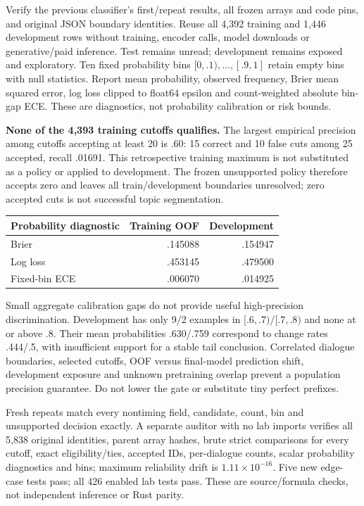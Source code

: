 \documentclass[11pt]{article}
\begin{document}
Verify the previous classifier's first/repeat results, all frozen arrays and
code pins, and original JSON boundary identities. Reuse all 4,392 training and
1,446 development rows without training, encoder calls, model downloads or
generative/paid inference. Test remains unread; development remains exposed and
exploratory. Ten fixed probability bins $[0,.1),\ldots,[.9,1]$ retain empty bins
with null statistics. Report mean probability, observed frequency, Brier mean
squared error, log loss clipped to float64 epsilon and count-weighted absolute
bin-gap ECE. These are diagnostics, not probability calibration or risk bounds.

\textbf{None of the 4,393 training cutoffs qualifies.} The largest empirical
precision among cutoffs accepting at least 20 is .60: 15 correct and 10 false
cuts among 25 accepted, recall .01691. This retrospective training maximum is
not substituted as a policy or applied to development. The frozen unsupported
policy therefore accepts zero and leaves all train/development boundaries
unresolved; zero accepted cuts is not successful topic segmentation.

\begin{center}\small
\begin{tabular}{lrr}
\toprule
Probability diagnostic & Training OOF & Development\\
\midrule
Brier & .145088 & .154947\\
Log loss & .453145 & .479500\\
Fixed-bin ECE & .006070 & .014925\\
\bottomrule
\end{tabular}\end{center}
Small aggregate calibration gaps do not provide useful high-precision
discrimination. Development has only 9/2 examples in $[.6,.7)/[.7,.8)$ and none
at or above .8. Their mean probabilities .630/.759 correspond to change rates
.444/.5, with insufficient support for a stable tail conclusion. Correlated
dialogue boundaries, selected cutoffs, OOF versus final-model prediction shift,
development exposure and unknown pretraining overlap prevent a population
precision guarantee. Do not lower the gate or substitute tiny perfect prefixes.

Fresh repeats match every nontiming field, candidate, count, bin and unsupported
decision exactly. A separate auditor with no lab imports verifies all 5,838
original identities, parent array hashes, brute strict comparisons for every
cutoff, exact eligibility/ties, accepted IDs, per-dialogue counts, scalar
probability diagnostics and bins; maximum reliability drift is
$1.11\times10^{-16}$. Five new edge-case tests pass; all 426 enabled lab tests
pass. These are source/formula checks, not independent inference or Rust parity.
\end{document}
